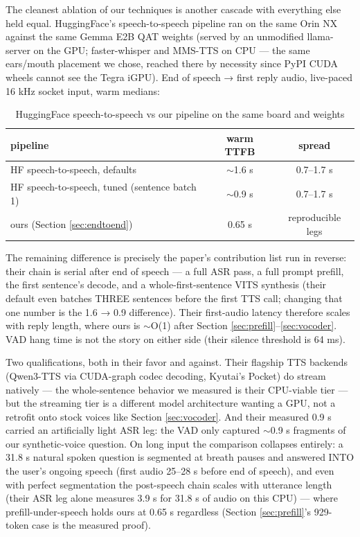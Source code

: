 \documentclass{article}
\begin{document}
The cleanest ablation of our techniques is another cascade with everything else held equal. HuggingFace's speech-to-speech pipeline ran on the same Orin NX against the same Gemma E2B QAT weights (served by an unmodified llama-server on the GPU; faster-whisper and MMS-TTS on CPU — the same ears/mouth placement we chose, reached there by necessity since PyPI CUDA wheels cannot see the Tegra iGPU). End of speech → first reply audio, live-paced 16 kHz socket input, warm medians:

\begin{table}[H]
	\centering
	\begin{tabular}{>{\raggedright\arraybackslash}p{4cm}cc}
		\toprule
		pipeline & warm TTFB & spread \\
		\midrule
		HF speech-to-speech, defaults & $\sim$1.6 s & 0.7--1.7 s \\
		HF speech-to-speech, tuned (sentence batch 1) & $\sim$0.9 s & 0.7--1.7 s \\
		ours (Section \ref{sec:endtoend}) & 0.65 s & reproducible legs \\
		\bottomrule
	\end{tabular}
	\caption{HuggingFace speech-to-speech vs our pipeline on the same board and weights}
	\label{tab:hf-comparison}
\end{table}

The remaining difference is precisely the paper's contribution list run in reverse: their chain is serial after end of speech — a full ASR pass, a full prompt prefill, the first sentence's decode, and a whole-first-sentence VITS synthesis (their default even batches THREE sentences before the first TTS call; changing that one number is the 1.6 → 0.9 difference). Their first-audio latency therefore scales with reply length, where ours is $\sim$O(1) after Section \ref{sec:prefill}–\ref{sec:vocoder}. VAD hang time is not the story on either side (their silence threshold is 64 ms).

Two qualifications, both in their favor and against. Their flagship TTS backends (Qwen3-TTS via CUDA-graph codec decoding, Kyutai's Pocket) do stream natively — the whole-sentence behavior we measured is their CPU-viable tier — but the streaming tier is a different model architecture wanting a GPU, not a retrofit onto stock voices like Section \ref{sec:vocoder}. And their measured 0.9 s carried an artificially light ASR leg: the VAD only captured $\sim$0.9 s fragments of our synthetic-voice question. On long input the comparison collapses entirely: a 31.8 s natural spoken question is segmented at breath pauses and answered INTO the user's ongoing speech (first audio 25–28 s before end of speech), and even with perfect segmentation the post-speech chain scales with utterance length (their ASR leg alone measures 3.9 s for 31.8 s of audio on this CPU) — where prefill-under-speech holds ours at 0.65 s regardless (Section \ref{sec:prefill}'s 929-token case is the measured proof).
\end{document}
